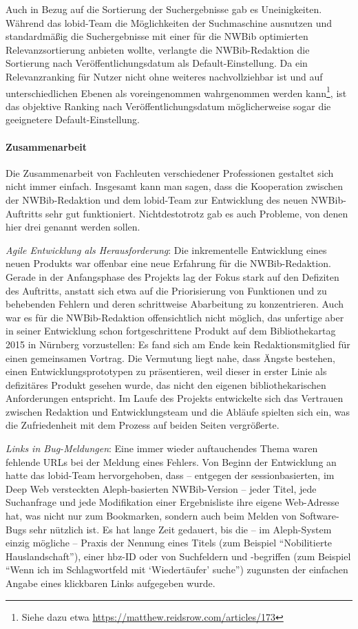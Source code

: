 \documentclass[a4paper,
fontsize=11pt,
oneside,
numbers=noperiodatend,
parskip=half-,
bibliography=totoc,
final
]{scrartcl}
\begin{document}
Auch in Bezug auf die Sortierung der Suchergebnisse gab es
Uneinigkeiten. Während das lobid-Team die Möglichkeiten der Suchmaschine
ausnutzen und standardmäßig die Suchergebnisse mit einer für die NWBib
optimierten Relevanzsortierung anbieten wollte, verlangte die
NWBib-Redaktion die Sortierung nach Veröffentlichungsdatum als
Default-Einstellung. Da ein Relevanzranking für Nutzer nicht ohne
weiteres nachvollziehbar ist und auf unterschiedlichen Ebenen als
voreingenommen wahrgenommen werden kann\footnote{Siehe dazu etwa
  \url{https://matthew.reidsrow.com/articles/173}}, ist das objektive
Ranking nach Veröffentlichungsdatum möglicherweise sogar die geeignetere
Default-Einstellung.

\paragraph{Zusammenarbeit}\label{zusammenarbeit}

Die Zusammenarbeit von Fachleuten verschiedener Professionen gestaltet
sich nicht immer einfach. Insgesamt kann man sagen, dass die Kooperation
zwischen der NWBib-Redaktion und dem lobid-Team zur Entwicklung des
neuen NWBib-Auftritts sehr gut funktioniert. Nichtdestotrotz gab es auch
Probleme, von denen hier drei genannt werden sollen.

\emph{Agile Entwicklung als Herausforderung}: Die inkrementelle
Entwicklung eines neuen Produkts war offenbar eine neue Erfahrung für
die NWBib-Redaktion. Gerade in der Anfangsphase des Projekts lag der
Fokus stark auf den Defiziten des Auftritts, anstatt sich etwa auf die
Priorisierung von Funktionen und zu behebenden Fehlern und deren
schrittweise Abarbeitung zu konzentrieren. Auch war es für die
NWBib-Redaktion offensichtlich nicht möglich, das unfertige aber in
seiner Entwicklung schon fortgeschrittene Produkt auf dem
Bibliothekartag 2015 in Nürnberg vorzustellen: Es fand sich am Ende kein
Redaktionsmitglied für einen gemeinsamen Vortrag. Die Vermutung liegt
nahe, dass Ängste bestehen, einen Entwicklungsprototypen zu
präsentieren, weil dieser in erster Linie als defizitäres Produkt
gesehen wurde, das nicht den eigenen bibliothekarischen Anforderungen
entspricht. Im Laufe des Projekts entwickelte sich das Vertrauen
zwischen Redaktion und Entwicklungsteam und die Abläufe spielten sich
ein, was die Zufriedenheit mit dem Prozess auf beiden Seiten
vergrößerte.

\emph{Links in Bug-Meldungen}: Eine immer wieder auftauchendes Thema
waren fehlende URLs bei der Meldung eines Fehlers. Von Beginn der
Entwicklung an hatte das lobid-Team hervorgehoben, dass -- entgegen der
sessionbasierten, im Deep Web versteckten Aleph-basierten NWBib-Version
-- jeder Titel, jede Suchanfrage und jede Modifikation einer
Ergebnisliste ihre eigene Web-Adresse hat, was nicht nur zum Bookmarken,
sondern auch beim Melden von Software-Bugs sehr nützlich ist. Es hat
lange Zeit gedauert, bis die -- im Aleph-System einzig mögliche --
Praxis der Nennung eines Titels (zum Beispiel \enquote{Nobilitierte
Hauslandschaft}), einer hbz-ID oder von Suchfeldern und -begriffen (zum
Beispiel \enquote{Wenn ich im Schlagwortfeld mit \enquote{Wiedertäufer}
suche}) zugunsten der einfachen Angabe eines klickbaren Links aufgegeben
wurde.
\end{document}

